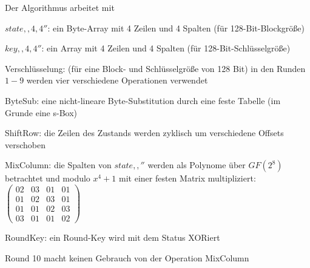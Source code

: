 \documentclass[a4paper]{article}
\begin{document}
\begin{multicols}{3}
      \begin{itemize*}
            \item Der Algorithmus arbeitet mit
            \begin{itemize*}
                  \item $state,,4, 4''$: ein Byte-Array mit 4 Zeilen und 4 Spalten (für 128-Bit-Blockgröße)
                  \item $key,,4, 4''$: ein Array mit 4 Zeilen und 4 Spalten (für 128-Bit-Schlüsselgröße)
            \end{itemize*}
            \item Verschlüsselung: (für eine Block- und Schlüsselgröße von 128 Bit) in
            den Runden $1-9$ werden vier verschiedene Operationen verwendet
            \begin{itemize*}
                  \item ByteSub: eine nicht-lineare Byte-Substitution durch eine feste Tabelle (im Grunde eine s-Box)
                  \item ShiftRow: die Zeilen des Zustands werden zyklisch um verschiedene Offsets verschoben
                  \item MixColumn: die Spalten von $state,,''$ werden als Polynome über $GF(2^8)$ betrachtet und modulo $x^4+1$ mit einer festen Matrix multipliziert: $\begin{pmatrix} 02&03&01&01\\ 01&02&03&01 \\ 01&01&02&03\\ 03&01&01&02 \end{pmatrix}$
                  \item RoundKey: ein Round-Key wird mit dem Status XORiert
            \end{itemize*}
            \item Round 10 macht keinen Gebrauch von der Operation MixColumn
      \end{itemize*}



\end{multicols}
\end{document}
